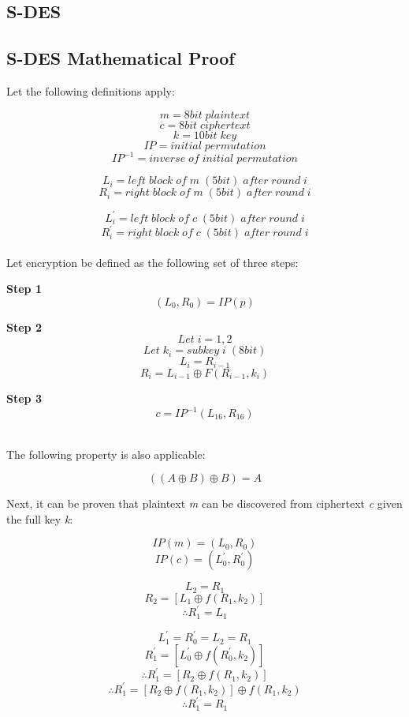 \documentclass[]{article}
\begin{document}
\vspace*{-0.8cm}
\begin{center}
	\section*{S-DES}
\end{center}

\vspace*{0.8cm}
\subsection*{S-DES Mathematical Proof}

Let the following definitions apply:

$$m = 8bit\;plaintext$$
$$c = 8bit\;ciphertext$$
$$k = 10bit\;key$$
$$IP = initial\;permutation$$
$$IP^{-1} = inverse\;of\;initial\;permutation$$

$$L_i = left\;block\;of\;m\;(5bit)\;after\;round\;i$$
$$R_i = right\;block\;of\;m\;(5bit)\;after\;round\;i$$

$$L^{'}_i = left\;block\;of\;c\;(5bit)\;after\;round\;i$$
$$R^{'}_i = right\;block\;of\;c\;(5bit)\;after\;round\;i$$\\

Let encryption be defined as the following set of three steps:\\

\begin{center}
\textbf{Step 1}
$$(L_0,R_0)=IP(p)$$

\textbf{Step 2}
$$Let\;i=1,2$$
$$Let\;k_i=subkey\;i\;(8bit)$$
$$L_i=R_{i-1}$$
$$R_i=L_{i-1}\oplus F(R_{i-1},k_i)$$

\textbf{Step 3}
$$c=IP^{-1}(L_{16},R_{16})$$\\
\end{center}

The following property is also applicable:

$$((A\oplus B) \oplus B) = A$$

\newpage
Next, it can be proven that plaintext \textit{m} can be discovered from ciphertext \textit{c} given the full key \textit{k}:

$$IP(m)=(L_0,R_0)$$
$$IP(c)=(L^{'}_0,R^{'}_0)$$

$$L_2=R_1$$
$$R_2=[L_1\oplus f(R_1,k_2)]$$
$$\therefore R^{'}_1=L_1$$

$$L^{'}_1=R^{'}_0=L_2=R_1$$
$$R^{'}_1=[L^{'}_0\oplus f(R^{'}_0,k_2)]$$
$$\therefore R^{'}_1=[R_2\oplus f(R_1,k_2)]$$
$$\therefore R^{'}_1=[R_2\oplus f(R_1,k_2)]\oplus f(R_1,k_2)$$
$$\therefore R^{'}_1=R_1$$\\
\end{document}
